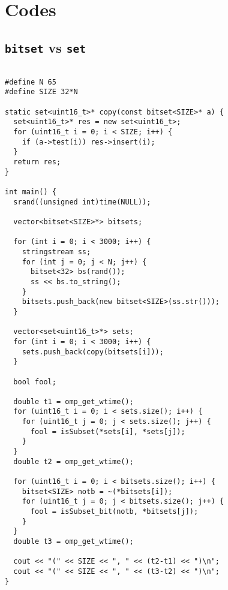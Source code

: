 \appendix
\chapter{Codes}
\section{\texttt{bitset} vs \texttt{set}}
\label{app:setbench}
\begin{verbatim}

#define N 65
#define SIZE 32*N

static set<uint16_t>* copy(const bitset<SIZE>* a) {
  set<uint16_t>* res = new set<uint16_t>;
  for (uint16_t i = 0; i < SIZE; i++) {
    if (a->test(i)) res->insert(i);
  }
  return res;
}

int main() {
  srand((unsigned int)time(NULL));

  vector<bitset<SIZE>*> bitsets;

  for (int i = 0; i < 3000; i++) {
    stringstream ss;
    for (int j = 0; j < N; j++) {
      bitset<32> bs(rand());
      ss << bs.to_string();
    }
    bitsets.push_back(new bitset<SIZE>(ss.str()));
  }

  vector<set<uint16_t>*> sets;
  for (int i = 0; i < 3000; i++) {
    sets.push_back(copy(bitsets[i]));
  }

  bool fool;

  double t1 = omp_get_wtime();
  for (uint16_t i = 0; i < sets.size(); i++) {
    for (uint16_t j = 0; j < sets.size(); j++) {
      fool = isSubset(*sets[i], *sets[j]);
    }
  }
  double t2 = omp_get_wtime();

  for (uint16_t i = 0; i < bitsets.size(); i++) {
    bitset<SIZE> notb = ~(*bitsets[i]);
    for (uint16_t j = 0; j < bitsets.size(); j++) {
      fool = isSubset_bit(notb, *bitsets[j]);
    }
  }
  double t3 = omp_get_wtime();

  cout << "(" << SIZE << ", " << (t2-t1) << ")\n";
  cout << "(" << SIZE << ", " << (t3-t2) << ")\n";
}

\end{verbatim}

